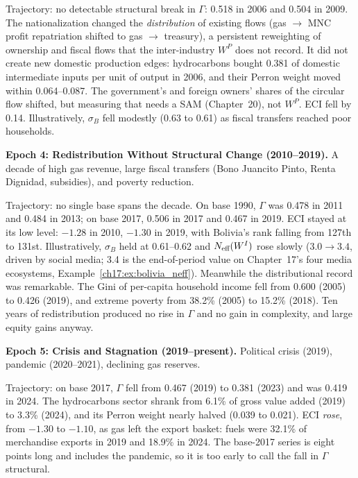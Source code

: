 \documentclass[../structural_economics_book.tex]{subfiles}
\begin{document}
\begin{example}
Trajectory: no detectable structural break in $\Gamma$: 0.518 in 2006 and 0.504 in 2009. The nationalization changed the \textit{distribution} of existing flows (gas $\to$ MNC profit repatriation shifted to gas $\to$ treasury), a persistent reweighting of ownership and fiscal flows that the inter-industry $W^P$ does not record. It did not create new domestic production edges: hydrocarbons bought 0.381 of domestic intermediate inputs per unit of output in 2006, and their Perron weight moved within 0.064--0.087. The government's and foreign owners' shares of the circular flow shifted, but measuring that needs a SAM (Chapter~20), not $W^P$. ECI fell by 0.14. Illustratively, $\sigma_B$ fell modestly (0.63 to 0.61) as fiscal transfers reached poor households.

\textbf{Epoch 4: Redistribution Without Structural Change (2010--2019).} A decade of high gas revenue, large fiscal transfers (Bono Juancito Pinto, Renta Dignidad, subsidies), and poverty reduction.

Trajectory: no single base spans the decade. On base 1990, $\Gamma$ was 0.478 in 2011 and 0.484 in 2013; on base 2017, 0.506 in 2017 and 0.467 in 2019. ECI stayed at its low level: $-1.28$ in 2010, $-1.30$ in 2019, with Bolivia's rank falling from 127th to 131st. Illustratively, $\sigma_B$ held at 0.61--0.62 and $N_{\text{eff}}(W^I)$ rose slowly ($3.0 \to 3.4$, driven by social media; 3.4 is the end-of-period value on Chapter~17's four media ecosystems, Example~\ref{ch17:ex:bolivia_neff}). Meanwhile the distributional record was remarkable. The Gini of per-capita household income fell from 0.600 (2005) to 0.426 (2019), and extreme poverty from 38.2\% (2005) to 15.2\% (2018). Ten years of redistribution produced no rise in $\Gamma$ and no gain in complexity, and large equity gains anyway.

\textbf{Epoch 5: Crisis and Stagnation (2019--present).} Political crisis (2019), pandemic (2020--2021), declining gas reserves.

Trajectory: on base 2017, $\Gamma$ fell from 0.467 (2019) to 0.381 (2023) and was 0.419 in 2024. The hydrocarbons sector shrank from 6.1\% of gross value added (2019) to 3.3\% (2024), and its Perron weight nearly halved (0.039 to 0.021). ECI \emph{rose}, from $-1.30$ to $-1.10$, as gas left the export basket: fuels were 32.1\% of merchandise exports in 2019 and 18.9\% in 2024. The base-2017 series is eight points long and includes the pandemic, so it is too early to call the fall in $\Gamma$ structural.


\end{example}
\end{document}
